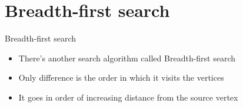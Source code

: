 \documentclass{beamer}
\begin{document}
\section*{Breadth-first search}

\begin{frame}[plain]{Breadth-first search}
    \vspace{30pt}
    \begin{itemize}
        \item There's another search algorithm called Breadth-first search
        \item Only difference is the order in which it visits the vertices
        \item It goes in order of increasing distance from the source vertex
    \end{itemize}
\end{frame}
\end{document}

